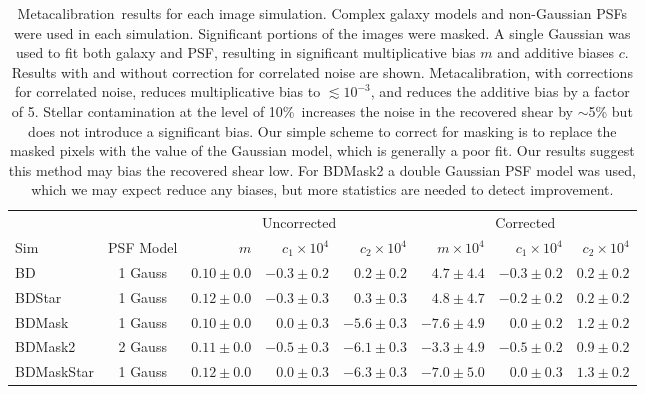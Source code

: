 \documentclass[usegraphicx,usenatbib]{mn2e}
\newcommand{\Mcal}{Metacalibration}
\newcommand{\nsimNstarperc}{10\%}
\begin{document}
\begin{table}
    \centering
    \caption{\Mcal\ results for each image simulation.  Complex galaxy models
        and non-Gaussian PSFs were used in each simulation.  Significant
        portions of the images were masked.  A single Gaussian was used
    to fit both galaxy and PSF, resulting in significant multiplicative 
    bias $m$ and additive biases $c$.  Results with and without correction
    for correlated noise are shown.  \Mcal, with corrections for correlated noise,
    reduces multiplicative bias to $\lesssim 10^{-3}$, and reduces the additive
    bias by a factor of 5.  
    Stellar contamination at the level of \nsimNstarperc\ increases
    the noise in the recovered shear by $\sim$5\% but does not introduce 
    a significant bias.  
    Our simple scheme to correct for masking is to
    replace the masked pixels with the value of the Gaussian model, which is generally
    a poor fit.  Our results suggest this method may bias the recovered shear low.
    For BDMask2 a double Gaussian PSF model was used, which we may expect reduce any biases, but
    more statistics are needed to detect improvement.
    \label{tab:results}}
    \begin{tabular}{ |l|  |c| r|r|r|  r|r|r|}
        \hline
        & & \multicolumn{3}{c}{Uncorrected} & \multicolumn{3}{c}{Corrected} \\
        Sim & PSF Model & $m$ & $c_1 \times 10^4$ & $c_2 \times 10^4$ & $m \times 10^{4}$ & $c_1 \times 10^4$ & $c_2 \times 10^4$ \\
        \hline
        BD              & 1 Gauss & $0.10 \pm 0.0$ & $-0.3 \pm 0.2$ & $0.2 \pm 0.2$ & $ 4.7 \pm 4.4$ & $-0.3 \pm 0.2$ & $0.2 \pm 0.2$  \\
        BDStar          & 1 Gauss & $0.12 \pm 0.0$ & $-0.3 \pm 0.3$ & $0.3 \pm 0.3$ & $ 4.8 \pm 4.7$ & $-0.2 \pm 0.2$ & $0.2 \pm 0.2$  \\
        BDMask          & 1 Gauss & $0.10 \pm 0.0$ & $0.0 \pm 0.3$ & $-5.6 \pm 0.3$ & $-7.6 \pm 4.9$ & $0.0 \pm 0.2$ & $1.2 \pm 0.2$  \\
        BDMask2         & 2 Gauss & $0.11 \pm 0.0$ & $-0.5 \pm 0.3$ & $-6.1 \pm 0.3$ & $-3.3 \pm 4.9$ & $-0.5 \pm 0.2$ & $0.9 \pm 0.2$  \\
        BDMaskStar      & 1 Gauss & $0.12 \pm 0.0$ & $0.0 \pm 0.3$ & $-6.3 \pm 0.3$ & $-7.0 \pm 5.0$ & $0.0 \pm 0.3$ & $1.3 \pm 0.2$  \\
    \end{tabular}
\end{table}
\end{document}
